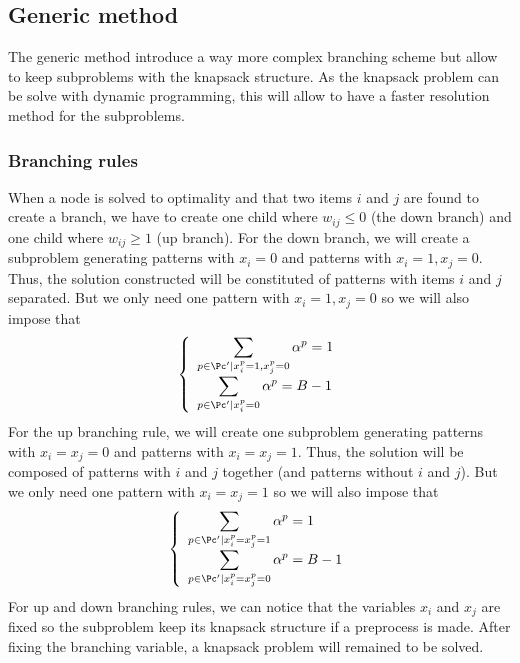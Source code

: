 \subsection{Generic method}
\label{generic}

The generic method introduce a way more complex branching scheme but allow to keep subproblems with the knapsack structure. As the knapsack problem can be solve with dynamic programming, this will allow to have a faster resolution method for the subproblems.

\subsubsection{Branching rules}

When a node is solved to optimality and that two items $i$ and $j$ are found to create a branch, we have to create one child where $w_{ij} \leq 0$ (the down branch) and one child where $w_{ij} \geq 1$ (up branch). For the down branch, we will create a subproblem generating patterns with $x_i = 0$ and patterns with $x_i = 1, x_j=0$. Thus, the solution constructed will be constituted of patterns with items $i$ and $j$ separated. But we only need one pattern with $x_i = 1, x_j=0$ so we will also impose that 
\begin{equation}
	\label{generic-down}
	\left \{
	\begin{array}{l}
	\displaystyle \sum_{p \in \Pc' | x_i^p=1, x_j^p=0} \alpha^p = 1 \\
	\displaystyle \sum_{p \in \Pc' | x_i^p=0} \alpha^p = B-1 \\
	\end{array}
	\right.
\end{equation}
For the up branching rule, we will create one subproblem generating patterns with $x_i = x_j = 0$ and patterns with $x_i = x_j = 1$. Thus, the solution will be composed of patterns with $i$ and $j$ together (and patterns without $i$ and $j$). But we only need one pattern with $x_i = x_j = 1$ so we will also impose that
\begin{equation}	
	\label{generic-up}
	\left \{
	\begin{array}{l}
	\displaystyle \sum_{p \in \Pc' | x_i^p= x_j^p=1} \alpha^p = 1 \\
	\displaystyle \sum_{p \in \Pc' | x_i^p= x_j^p=0} \alpha^p = B-1 \\
	\end{array}
	\right.
\end{equation}
For up and down branching rules, we can notice that the variables $x_i$ and $x_j$ are fixed so the subproblem keep its knapsack structure if a preprocess is made. After fixing the branching variable, a knapsack problem will remained to be solved.

